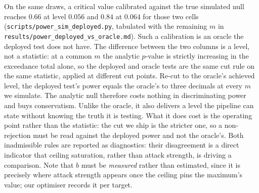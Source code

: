 On the same draws, a critical value calibrated
against the true simulated null reaches $0.66$
at level $0.056$ and $0.84$ at $0.064$ for those two cells
(\texttt{scripts/power\_sim\_deployed.py}, tabulated with the remaining $m$ in
\texttt{results/power\_deployed\_vs\_oracle.md}). Such a calibration is an oracle
the deployed test does not have. The difference between the two
columns is a level, not a statistic: at a common $m$ the analytic $p$-value is strictly
increasing in the exceedance total alone, so the deployed and oracle tests are the same cut
rule on the same statistic, applied at different cut points. Re-cut to the oracle's achieved
level, the deployed test's power equals the oracle's to three decimals at every $m$ we
simulate. The analytic null therefore costs nothing in discriminating power and buys
conservatism. Unlike the oracle, it also delivers a level the pipeline can state without
knowing the truth it is testing. What it does cost is the operating point rather than the
statistic: the cut we ship is the stricter one, so a non-rejection must be read against the
deployed power and not the oracle's. Both inadmissible rules are
reported as diagnostics: their disagreement is a direct indicator that ceiling saturation,
rather than attack strength, is driving a comparison. Note that $b$ must be \emph{measured}
rather than estimated, since it is precisely where attack strength appears once the ceiling
pins the maximum's value; our optimiser records it per target.


